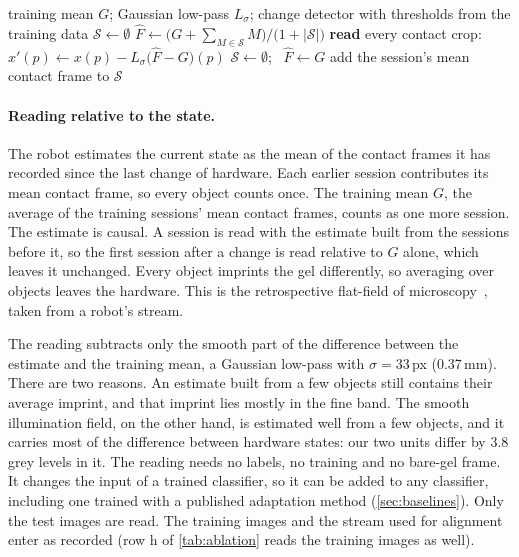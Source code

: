 \begin{algorithm}[t]
\caption{Reading the robot's stream relative to its hardware state}
\label{alg:tracker}
\begin{algorithmic}[1]
\Require training mean $G$; Gaussian low-pass $L_\sigma$; change detector with thresholds from the training data
\State $\mathcal S \gets \emptyset$ 
  \State $\hat F \gets \big(G + \sum_{M\in\mathcal S} M\big) / \big(1 + |\mathcal S|\big)$
    \State \textbf{read} every contact crop: $x'(p) \gets x(p) - L_\sigma\big(\hat F - G\big)(p)$ 
      \State $\mathcal S \gets \emptyset$; \ $\hat F \gets G$
    \EndIf
  \EndFor
  \State add the session's mean contact frame to $\mathcal S$
\EndFor
\end{algorithmic}
\end{algorithm}

\paragraph{Reading relative to the state.}
The robot estimates the current state as the mean of the contact frames it has recorded since the last change of hardware. Each earlier session contributes its mean contact frame, so every object counts once. The training mean $G$, the average of the training sessions' mean contact frames, counts as one more session. The estimate is causal. A session is read with the estimate built from the sessions before it, so the first session after a change is read relative to $G$ alone, which leaves it unchanged. Every object imprints the gel differently, so averaging over objects leaves the hardware. This is the retrospective flat-field of microscopy~\cite{singh2014illumination,peng2017basic}, taken from a robot's stream.

The reading subtracts only the smooth part of the difference between the estimate and the training mean, a Gaussian low-pass with $\sigma = 33$\,px (0.37\,mm). There are two reasons. An estimate built from a few objects still contains their average imprint, and that imprint lies mostly in the fine band. The smooth illumination field, on the other hand, is estimated well from a few objects, and it carries most of the difference between hardware states: our two units differ by 3.8 grey levels in it. The reading needs no labels, no training and no bare-gel frame. It changes the input of a trained classifier, so it can be added to any classifier, including one trained with a published adaptation method (\cref{sec:baselines}). Only the test images are read. The training images and the stream used for alignment enter as recorded (row h of \cref{tab:ablation} reads the training images as well).

